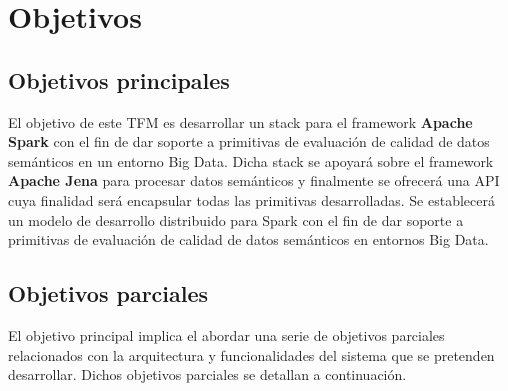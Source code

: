 \chapter{Objetivos}
\label{chap:objetivos}

\section{Objetivos principales}

El objetivo de este \acf{TFM} es desarrollar un stack para el framework \textbf{Apache Spark} con el fin de dar soporte a primitivas de evaluación de calidad de datos semánticos en un entorno Big Data. Dicha stack se apoyará
  sobre el framework \textbf{Apache Jena} para procesar datos semánticos y
  finalmente se ofrecerá una \acs{API} cuya finalidad será encapsular todas
las primitivas desarrolladas. Se establecerá un modelo de
  desarrollo distribuido para Spark con el fin de dar soporte
  a primitivas de evaluación de calidad de datos semánticos en entornos Big Data.


\section{Objetivos parciales}

El objetivo principal implica el abordar una serie de objetivos parciales
relacionados con la arquitectura y funcionalidades del sistema que se pretenden
desarrollar. Dichos objetivos parciales se detallan a continuación. 


